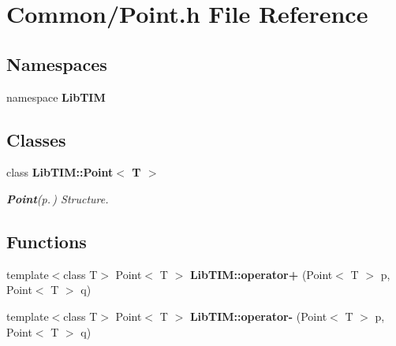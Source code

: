 \section{Common/Point.h File Reference}
\label{Point_8h}
\subsection*{Namespaces}
\begin{CompactItemize}
\item 
namespace {\bf Lib\-TIM}
\end{CompactItemize}
\subsection*{Classes}
\begin{CompactItemize}
\item 
class {\bf Lib\-TIM::Point$<$ T $>$}
\begin{CompactList}\small\item\em {\bf Point}{\rm (p.\,\pageref{classLibTIM_1_1Point})} Structure. \item\end{CompactList}\end{CompactItemize}
\subsection*{Functions}
\begin{CompactItemize}
\item 
template$<$class T$>$ Point$<$ T $>$ {\bf Lib\-TIM::operator+} (Point$<$ T $>$ p, Point$<$ T $>$ q)
\item 
template$<$class T$>$ Point$<$ T $>$ {\bf Lib\-TIM::operator-} (Point$<$ T $>$ p, Point$<$ T $>$ q)
\end{CompactItemize}

